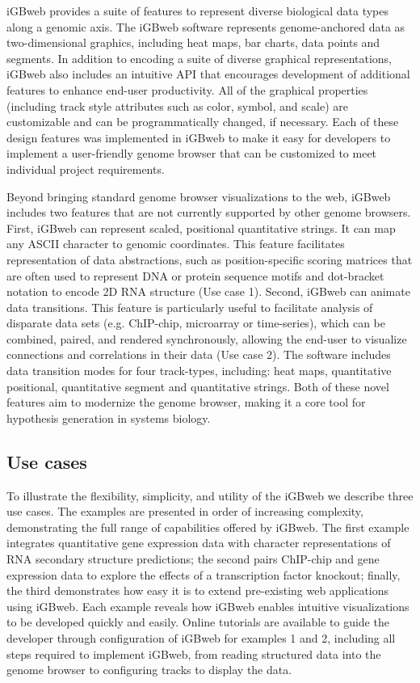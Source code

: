 iGBweb provides a suite of features to represent diverse biological data types along a genomic axis. The iGBweb software represents genome-anchored data as two-dimensional graphics, including heat maps, bar charts, data points and segments. In addition to encoding a suite of diverse graphical representations, iGBweb also includes an intuitive API that encourages development of additional features to enhance end-user productivity. All of the graphical properties (including track style attributes such as color, symbol, and scale) are customizable and can be programmatically changed, if necessary. Each of these design features was implemented in iGBweb to make it easy for developers to implement a user-friendly genome browser that can be customized to meet individual project requirements. 

Beyond bringing standard genome browser visualizations to the web, iGBweb includes two features that are not currently supported by other genome browsers. First, iGBweb can represent scaled, positional quantitative strings. It can map any ASCII character to genomic coordinates. This feature facilitates representation of data abstractions, such as position-specific scoring matrices that are often used to represent DNA or protein sequence motifs and dot-bracket notation to encode 2D RNA structure (Use case 1). Second, iGBweb can animate data transitions. This feature is particularly useful to facilitate analysis of disparate data sets (e.g. ChIP-chip, microarray or time-series), which can be combined, paired, and rendered synchronously, allowing the end-user to visualize connections and correlations in their data (Use case 2). The software includes data transition modes for four track-types, including: heat maps, quantitative positional, quantitative segment and quantitative strings. Both of these novel features aim to modernize the genome browser, making it a core tool for hypothesis generation in systems biology.  

\subsection{Use cases}
	 	 	
To illustrate the flexibility, simplicity, and utility of the iGBweb we describe three use cases. The examples are presented in order of increasing complexity, demonstrating the full range of capabilities offered by iGBweb. The first example integrates quantitative gene expression data with character representations of RNA secondary structure predictions; the second pairs ChIP-chip and gene expression data to explore the effects of a transcription factor knockout; finally, the third demonstrates how easy it is to extend pre-existing web applications using iGBweb. Each example reveals how iGBweb enables intuitive visualizations to be developed quickly and easily. Online tutorials are available to guide the developer through configuration of iGBweb for examples 1 and 2, including all steps required to implement iGBweb, from reading structured data into the genome browser to configuring tracks to display the data.

